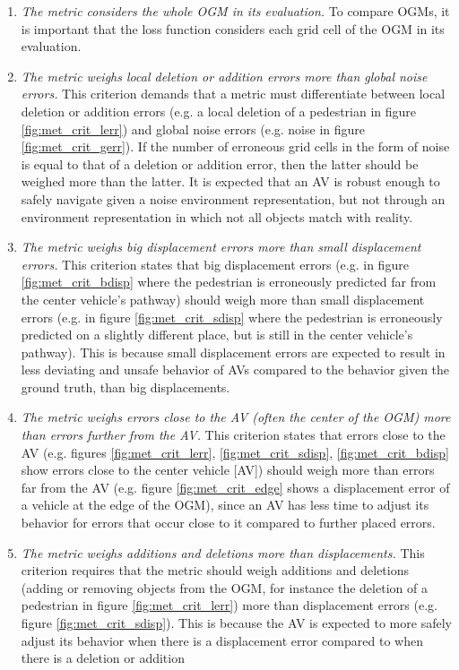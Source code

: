 \begin{enumerate}
	\item \textit{The metric considers the whole \gls{OGM} in its evaluation.} To compare \glspl{OGM}, it is important that the loss function considers each grid cell of the \gls{OGM} in its evaluation.
	\item \textit{The metric weighs local deletion or addition errors more than global noise errors.} This criterion demands that a metric must differentiate between local deletion or addition errors (e.g. a local deletion of a pedestrian in figure \ref{fig:met_crit_lerr}) and global noise errors (e.g. noise in figure \ref{fig:met_crit_gerr}). If the number of erroneous grid cells in the form of noise is equal to that of a deletion or addition error, then the latter should be weighed more than the latter. It is expected that an \gls{AV} is robust enough to safely navigate given a noise environment representation, but not through an environment representation in which not all objects match with reality. 
	\item \textit{The metric weighs big displacement errors more than small displacement errors.} This criterion states that big displacement errors (e.g. in figure \ref{fig:met_crit_bdisp} where the pedestrian is erroneously predicted far from the center vehicle's pathway) should weigh more than small displacement errors (e.g. in figure \ref{fig:met_crit_sdisp} where the pedestrian is erroneously predicted on a slightly different place, but is still in the center vehicle's pathway). This is because small displacement errors are expected to result in less deviating and unsafe behavior of \glspl{AV} compared to the behavior given the ground truth, than big displacements.
	\item \textit{The metric weighs errors close to the \gls{AV} (often the center of the \gls{OGM}) more than errors further from the \gls{AV}.} This criterion states that errors close to the \gls{AV} (e.g. figures \ref{fig:met_crit_lerr}, \ref{fig:met_crit_sdisp}, \ref{fig:met_crit_bdisp} show errors close to the center vehicle [\gls{AV}]) should weigh more than errors far from the \gls{AV} (e.g. figure \ref{fig:met_crit_edge} shows a displacement error of a vehicle at the edge of the \gls{OGM}), since an \gls{AV} has less time to adjust its behavior for errors that occur close to it compared to further placed errors.
	\item \textit{The metric weighs additions and deletions more than displacements.} This criterion requires that the metric should weigh additions and deletions (adding or removing objects from the \gls{OGM}, for instance the deletion of a pedestrian in figure \ref{fig:met_crit_lerr}) more than displacement errors (e.g. figure \ref{fig:met_crit_sdisp}). This is because the \gls{AV} is expected to more safely adjust its behavior when there is a displacement error compared to when there is a deletion or addition
\end{enumerate}


